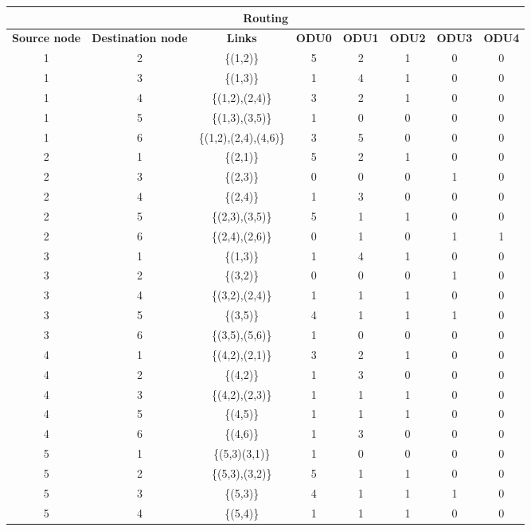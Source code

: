 \begin{table}[H]
	\centering
	\begin{tabular}{|c|c|c|c|c|c|c|c|}
		\hline
		\multicolumn{8}{|c|}{\textbf{Routing}} \\ \hline
		\textbf{Source node} & \textbf{Destination node} & \textbf{Links} & \textbf{ODU0} & \textbf{ODU1} & \textbf{ODU2} & \textbf{ODU3} & \textbf{ODU4} \\ \hline
		1 & 2 & \{(1,2)\} & 5 & 2 & 1 & 0 & 0 \\ \hline
		1 & 3 & \{(1,3)\} & 1 & 4 & 1 & 0 & 0 \\ \hline
		1 & 4 & \{(1,2),(2,4)\} & 3 & 2 & 1 & 0 & 0 \\ \hline
		1 & 5 & \{(1,3),(3,5)\} & 1 & 0 & 0 & 0 & 0 \\ \hline
		1 & 6 & \{(1,2),(2,4),(4,6)\} & 3 & 5 & 0 & 0 & 0 \\ \hline
		2 & 1 & \{(2,1)\} & 5 & 2 & 1 & 0 & 0 \\ \hline
		2 & 3 & \{(2,3)\} & 0 & 0 & 0 & 1 & 0 \\ \hline
		2 & 4 & \{(2,4)\} & 1 & 3 & 0 & 0 & 0 \\ \hline
		2 & 5 & \{(2,3),(3,5)\} & 5 & 1 & 1 & 0 & 0 \\ \hline
		2 & 6 & \{(2,4),(2,6)\} & 0 & 1 & 0 & 1 & 1 \\ \hline
		3 & 1 & \{(1,3)\} & 1 & 4 & 1 & 0 & 0 \\ \hline
		3 & 2 & \{(3,2)\} & 0 & 0 & 0 & 1 & 0 \\ \hline
		3 & 4 & \{(3,2),(2,4)\} & 1 & 1 & 1 & 0 & 0 \\ \hline
		3 & 5 & \{(3,5)\} & 4 & 1 & 1 & 1 & 0 \\ \hline
		3 & 6 & \{(3,5),(5,6)\} & 1 & 0 & 0 & 0 & 0 \\ \hline
		4 & 1 & \{(4,2),(2,1)\} & 3 & 2 & 1 & 0 & 0 \\ \hline
		4 & 2 & \{(4,2)\} & 1 & 3 & 0 & 0 & 0 \\ \hline
		4 & 3 & \{(4,2),(2,3)\} & 1 & 1 & 1 & 0 & 0 \\ \hline
		4 & 5 & \{(4,5)\} & 1 & 1 & 1 & 0 & 0 \\ \hline
		4 & 6 & \{(4,6)\} & 1 & 3 & 0 & 0 & 0 \\ \hline
		5 & 1 & \{(5,3)(3,1)\} & 1 & 0 & 0 & 0 & 0 \\ \hline
		5 & 2 & \{(5,3),(3,2)\} & 5 & 1 & 1 & 0 & 0 \\ \hline
		5 & 3 & \{(5,3)\} & 4 & 1 & 1 & 1 & 0 \\ \hline
		5 & 4 & \{(5,4)\} & 1 & 1 & 1 & 0 & 0 \\ \hline

\end{tabular}
\end{table}

